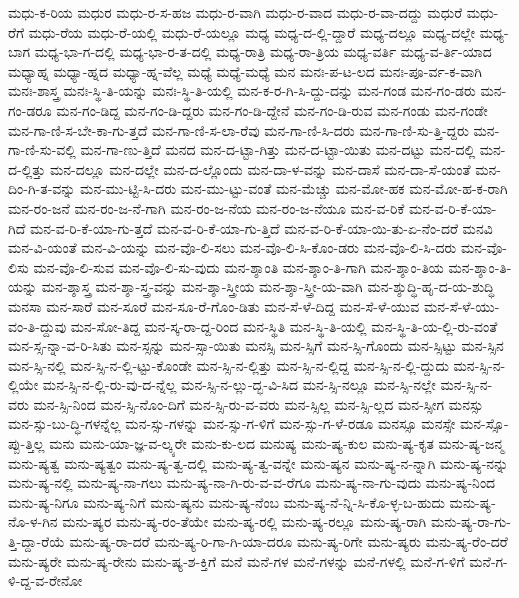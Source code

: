 {ಮಧು-ಕ-ರಿಯ
ಮಧುರ
ಮಧು-ರ-ಸ-ಹಜ
ಮಧು-ರ-ವಾಗಿ
ಮಧು-ರ-ವಾದ
ಮಧು-ರ-ವಾ-ದದ್ದು
ಮಧುರೆ
ಮಧು-ರೆಗೆ
ಮಧು-ರೆಯ
ಮಧು-ರೆ-ಯಲ್ಲಿ
ಮಧು-ರೆ-ಯಲ್ಲೂ
ಮಧ್ಯ
ಮಧ್ಯ-ದ-ಲ್ಲಿ-ದ್ದಾರೆ
ಮಧ್ಯ-ದಲ್ಲೂ
ಮಧ್ಯ-ದಲ್ಲೇ
ಮಧ್ಯ-ಬಾಗ
ಮಧ್ಯ-ಭಾ-ಗ-ದಲ್ಲಿ
ಮಧ್ಯ-ಭಾ-ರ-ತ-ದಲ್ಲಿ
ಮಧ್ಯ-ರಾತ್ರಿ
ಮಧ್ಯ-ರಾ-ತ್ರಿಯ
ಮಧ್ಯ-ವರ್ತಿ
ಮಧ್ಯ-ವ-ರ್ತಿ-ಯಾದ
ಮಧ್ಯಾಹ್ನ
ಮಧ್ಯಾ-ಹ್ನದ
ಮಧ್ಯಾ-ಹ್ನ-ವೆಲ್ಲ
ಮಧ್ಯೆ
ಮಧ್ಯೆ-ಮಧ್ಯೆ
ಮನ
ಮನಃ-ಪ-ಟ-ಲದ
ಮನಃ-ಪೂ-ರ್ವ-ಕ-ವಾಗಿ
ಮನಃ-ಶಾಸ್ತ್ರ
ಮನಃ-ಸ್ಥಿ-ತಿ-ಯನ್ನು
ಮನಃ-ಸ್ಥಿ-ತಿ-ಯಲ್ಲಿ
ಮನ-ಕ-ರ-ಗಿ-ಸಿ-ದ್ದು-ದನ್ನು
ಮನ-ಗಂಡ
ಮನ-ಗಂ-ಡರು
ಮನ-ಗಂ-ಡರೂ
ಮನ-ಗಂ-ಡಿದ್ದ
ಮನ-ಗಂ-ಡಿ-ದ್ದರು
ಮನ-ಗಂ-ಡಿ-ದ್ದೇನೆ
ಮನ-ಗಂ-ಡಿ-ರುವ
ಮನ-ಗಂಡು
ಮನ-ಗಂಡೇ
ಮನ-ಗಾ-ಣಿ-ಸ-ಬೇ-ಕಾ-ಗು-ತ್ತದೆ
ಮನ-ಗಾ-ಣಿ-ಸ-ಲಾ-ರೆವು
ಮನ-ಗಾ-ಣಿ-ಸಿ-ದರು
ಮನ-ಗಾ-ಣಿ-ಸು-ತ್ತಿ-ದ್ದರು
ಮನ-ಗಾ-ಣಿ-ಸು-ವಲ್ಲಿ
ಮನ-ಗಾ-ಣು-ತ್ತಿದೆ
ಮನದ
ಮನ-ದ-ಟ್ಟಾ-ಗಿತ್ತು
ಮನ-ದ-ಟ್ಟಾ-ಯಿತು
ಮನ-ದಟ್ಟು
ಮನ-ದಲ್ಲಿ
ಮನ-ದ-ಲ್ಲಿತ್ತು
ಮನ-ದಲ್ಲೂ
ಮನ-ದಲ್ಲೇ
ಮನ-ದ-ಲ್ಲೊಂದು
ಮನ-ದಾ-ಳ-ವನ್ನು
ಮನ-ದಾಸೆ
ಮನ-ದಾ-ಸೆ-ಯಂತೆ
ಮನ-ದಿಂ-ಗಿ-ತ-ವನ್ನು
ಮನ-ಮು-ಟ್ಟಿ-ಸಿ-ದರು
ಮನ-ಮು-ಟ್ಟು-ವಂತೆ
ಮನ-ಮೆಚ್ಚು
ಮನ-ಮೋ-ಹಕ
ಮನ-ಮೋ-ಹ-ಕ-ರಾಗಿ
ಮನ-ರಂ-ಜನೆ
ಮನ-ರಂ-ಜ-ನೆ-ಗಾಗಿ
ಮನ-ರಂ-ಜ-ನೆಯ
ಮನ-ರಂ-ಜ-ನೆಯೂ
ಮನ-ವ-ರಿಕೆ
ಮನ-ವ-ರಿ-ಕೆ-ಯಾ-ಗಿದೆ
ಮನ-ವ-ರಿ-ಕೆ-ಯಾ-ಗು-ತ್ತದೆ
ಮನ-ವ-ರಿ-ಕೆ-ಯಾ-ಗು-ತ್ತಿದೆ
ಮನ-ವ-ರಿ-ಕೆ-ಯಾ-ಯಿ-ತು-ಏ-ನೆಂ-ದರೆ
ಮನವಿ
ಮನ-ವಿ-ಯಂತೆ
ಮನ-ವಿ-ಯನ್ನು
ಮನ-ವೊ-ಲಿ-ಸಲು
ಮನ-ವೊ-ಲಿ-ಸಿ-ಕೊಂ-ಡರು
ಮನ-ವೊ-ಲಿ-ಸಿ-ದರು
ಮನ-ವೊ-ಲಿಸು
ಮನ-ವೊ-ಲಿ-ಸುವ
ಮನ-ವೊ-ಲಿ-ಸು-ವುದು
ಮನ-ಶ್ಶಾಂತಿ
ಮನ-ಶ್ಶಾಂ-ತಿ-ಗಾಗಿ
ಮನ-ಶ್ಶಾಂ-ತಿಯ
ಮನ-ಶ್ಶಾಂ-ತಿ-ಯನ್ನು
ಮನ-ಶ್ಶಾಸ್ತ್ರ
ಮನ-ಶ್ಶಾ-ಸ್ತ್ರ-ವನ್ನು
ಮನ-ಶ್ಶಾ-ಸ್ತ್ರೀಯ
ಮನ-ಶ್ಶಾ-ಸ್ತ್ರೀ-ಯ-ವಾಗಿ
ಮನ-ಶ್ಶುದ್ಧಿ-ಹೃ-ದ-ಯ-ಶುದ್ಧಿ
ಮನಸಾ
ಮನ-ಸಾರೆ
ಮನ-ಸೂರೆ
ಮನ-ಸೂ-ರೆ-ಗೊಂ-ಡಿತು
ಮನ-ಸೆ-ಳೆ-ದಿದ್ದ
ಮನ-ಸೆ-ಳೆ-ಯುವ
ಮನ-ಸೆ-ಳೆ-ಯು-ವಂ-ತಿ-ದ್ದುವು
ಮನ-ಸೋ-ತಿದ್ದ
ಮನ-ಸ್ಕ-ರಾ-ದ್ದ-ರಿಂದ
ಮನ-ಸ್ಥಿತಿ
ಮನ-ಸ್ಥಿ-ತಿ-ಯಲ್ಲಿ
ಮನ-ಸ್ಥಿ-ತಿ-ಯ-ಲ್ಲಿ-ರು-ವಂತೆ
ಮನ-ಸ್ಸ-ನ್ನಾ-ವ-ರಿ-ಸಿತು
ಮನ-ಸ್ಸನ್ನು
ಮನ-ಸ್ಸಾ-ಯಿತು
ಮನಸ್ಸಿ
ಮನ-ಸ್ಸಿಗೆ
ಮನ-ಸ್ಸಿ-ಗೊಂದು
ಮನ-ಸ್ಸಿಟ್ಟು
ಮನ-ಸ್ಸಿನ
ಮನ-ಸ್ಸಿ-ನಲ್ಲಿ
ಮನ-ಸ್ಸಿ-ನ-ಲ್ಲಿ-ಟ್ಟು-ಕೊಂಡೇ
ಮನ-ಸ್ಸಿ-ನ-ಲ್ಲಿತ್ತು
ಮನ-ಸ್ಸಿ-ನ-ಲ್ಲಿದ್ದ
ಮನ-ಸ್ಸಿ-ನ-ಲ್ಲಿ-ದ್ದುದು
ಮನ-ಸ್ಸಿ-ನ-ಲ್ಲಿಯೇ
ಮನ-ಸ್ಸಿ-ನ-ಲ್ಲಿ-ರು-ವು-ದ-ನ್ನೆಲ್ಲ
ಮನ-ಸ್ಸಿ-ನ-ಲ್ಲು-ದ್ಭ-ವಿ-ಸಿದ
ಮನ-ಸ್ಸಿ-ನಲ್ಲೂ
ಮನ-ಸ್ಸಿ-ನಲ್ಲೇ
ಮನ-ಸ್ಸಿ-ನ-ವರು
ಮನ-ಸ್ಸಿ-ನಿಂದ
ಮನ-ಸ್ಸಿ-ನೊಂ-ದಿಗೆ
ಮನ-ಸ್ಸಿ-ರು-ವ-ವರು
ಮನ-ಸ್ಸಿಲ್ಲ
ಮನ-ಸ್ಸಿ-ಲ್ಲದ
ಮನ-ಸ್ಸೀಗ
ಮನಸ್ಸು
ಮನ-ಸ್ಸು-ಬು-ದ್ಧಿ-ಗಳನ್ನೆಲ್ಲ
ಮನ-ಸ್ಸು-ಗಳನ್ನು
ಮನ-ಸ್ಸು-ಗ-ಳಿಗೆ
ಮನ-ಸ್ಸು-ಗ-ಳೆ-ರಡೂ
ಮನಸ್ಸೂ
ಮನಸ್ಸೇ
ಮನ-ಸ್ಸೊ-ಪ್ಪು-ತ್ತಿಲ್ಲ
ಮನು
ಮನು-ಯಾ-ಜ್ಞ-ವ-ಲ್ಕ್ಯರೇ
ಮನು-ಕು-ಲದ
ಮನುಷ್ಯ
ಮನು-ಷ್ಯ-ಕುಲ
ಮನು-ಷ್ಯ-ಕೃತ
ಮನು-ಷ್ಯ-ಜನ್ಮ
ಮನು-ಷ್ಯತ್ವ
ಮನು-ಷ್ಯತ್ವಂ
ಮನು-ಷ್ಯ-ತ್ವ-ದಲ್ಲಿ
ಮನು-ಷ್ಯ-ತ್ವ-ವನ್ನೇ
ಮನು-ಷ್ಯನ
ಮನು-ಷ್ಯ-ನ-ನ್ನಾಗಿ
ಮನು-ಷ್ಯ-ನನ್ನು
ಮನು-ಷ್ಯ-ನಲ್ಲಿ
ಮನು-ಷ್ಯ-ನಾ-ಗಲು
ಮನು-ಷ್ಯ-ನಾ-ಗಿ-ರು-ವ-ವ-ರೆಗೂ
ಮನು-ಷ್ಯ-ನಾ-ಗು-ವುದು
ಮನು-ಷ್ಯ-ನಿಂದ
ಮನು-ಷ್ಯ-ನಿಗೂ
ಮನು-ಷ್ಯ-ನಿಗೆ
ಮನು-ಷ್ಯನು
ಮನು-ಷ್ಯ-ನೆಂಬ
ಮನು-ಷ್ಯ-ನೆ-ನ್ನಿ-ಸಿ-ಕೊ-ಳ್ಳ-ಬ-ಹುದು
ಮನು-ಷ್ಯ-ನೊ-ಳ-ಗಿನ
ಮನು-ಷ್ಯರ
ಮನು-ಷ್ಯ-ರಂ-ತೆಯೇ
ಮನು-ಷ್ಯ-ರಲ್ಲಿ
ಮನು-ಷ್ಯ-ರಲ್ಲೂ
ಮನು-ಷ್ಯ-ರಾಗಿ
ಮನು-ಷ್ಯ-ರಾ-ಗು-ತ್ತಿ-ದ್ದಾ-ರೆಯೆ
ಮನು-ಷ್ಯ-ರಾ-ದರೆ
ಮನು-ಷ್ಯ-ರಿ-ಗಾ-ಗಿ-ಯಾ-ದರೂ
ಮನು-ಷ್ಯ-ರಿಗೇ
ಮನು-ಷ್ಯರು
ಮನು-ಷ್ಯ-ರೆಂ-ದರೆ
ಮನು-ಷ್ಯರೇ
ಮನು-ಷ್ಯ-ರೇನು
ಮನು-ಷ್ಯ-ಶ-ಕ್ತಿಗೆ
ಮನೆ
ಮನೆ-ಗಳ
ಮನೆ-ಗಳನ್ನು
ಮನೆ-ಗಳಲ್ಲಿ
ಮನೆ-ಗ-ಳಿಗೆ
ಮನೆ-ಗ-ಳಿ-ದ್ದ-ವ-ರೇನೋ
}
